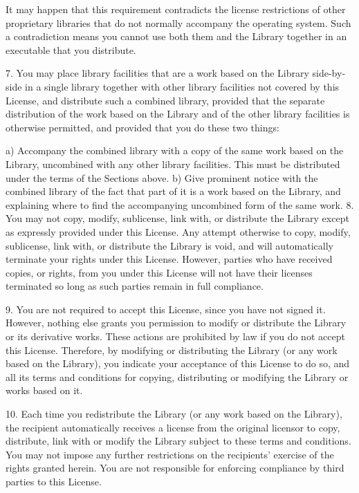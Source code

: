 \begin{DoxyVerb}
It may happen that this requirement contradicts the license restrictions of other proprietary
libraries that do not normally accompany the operating system. Such a contradiction means you cannot
use both them and the Library together in an executable that you distribute.

7. You may place library facilities that are a work based on the Library side-by-side in a single
library together with other library facilities not covered by this License, and distribute such a
combined library, provided that the separate distribution of the work based on the Library and of
the other library facilities is otherwise permitted, and provided that you do these two things:

a) Accompany the combined library with a copy of the same work based on the Library, uncombined with
any other library facilities. This must be distributed under the terms of the Sections above.
b) Give prominent notice with the combined library of the fact that part of it is a work based on
the Library, and explaining where to find the accompanying uncombined form of the same work.
8. You may not copy, modify, sublicense, link with, or distribute the Library except as expressly
provided under this License. Any attempt otherwise to copy, modify, sublicense, link with, or
distribute the Library is void, and will automatically terminate your rights under this License.
However, parties who have received copies, or rights, from you under this License will not have
their licenses terminated so long as such parties remain in full compliance.

9. You are not required to accept this License, since you have not signed it. However, nothing else
grants you permission to modify or distribute the Library or its derivative works. These actions are
prohibited by law if you do not accept this License. Therefore, by modifying or distributing the
Library (or any work based on the Library), you indicate your acceptance of this License to do so,
and all its terms and conditions for copying, distributing or modifying the Library or works based
on it.

10. Each time you redistribute the Library (or any work based on the Library), the recipient
automatically receives a license from the original licensor to copy, distribute, link with or modify
the Library subject to these terms and conditions. You may not impose any further restrictions on
the recipients' exercise of the rights granted herein. You are not responsible for enforcing
compliance by third parties to this License.


\end{DoxyVerb}
